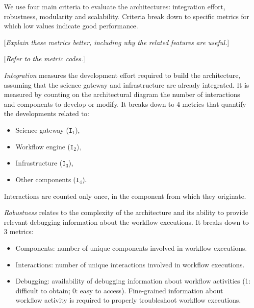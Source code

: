 \documentclass[preprint,3p,twocolumn]{elsarticle}
\newcommand{\todo}[1]{\color{blue}\xspace[\emph{#1}]\xspace\color{black}}
\begin{document}
We use four main criteria to evaluate the architectures: integration
effort, robustness, modularity and scalability. Criteria break down to
specific metrics for which low values indicate good performance.

\todo{Explain these metrics better, including why the related features
  are useful.}

\todo{Refer to the metric codes.}

\emph{Integration} measures the development effort required to build
the architecture, assuming that the science gateway and infrastructure
are already integrated. It is measured by counting on the
architectural diagram the number of interactions and components to
develop or modify. It breaks down to 4 metrics that quantify the
developments related to:
\begin{itemize}[itemsep=0cm]
\item Science gateway (\texttt{I$_1$}),
\item Workflow engine (\texttt{I$_2$}),
\item Infrastructure (\texttt{I$_3$}),
\item Other components (\texttt{I$_4$}).
\end{itemize}
Interactions are counted only once, in the component from which they
originate.


\emph{Robustness} relates to the complexity of the architecture and
its ability to provide relevant debugging information about the
workflow executions. It breaks down to 3 metrics:
\begin{itemize}[itemsep=0cm]
\item Components: number of unique components involved in workflow executions.
\item Interactions: number of unique interactions involved in workflow executions. 
\item Debugging: availability of debugging information about workflow
  activities (1: difficult to obtain; 0: easy to access). Fine-grained
  information about workflow activity is required to properly
  troubleshoot workflow executions.
\end{itemize}
\end{document}
